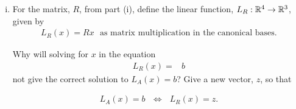 \begin{question}
\begin{enumerate}[(i)]
        \item For the matrix, $R$, from part (i), define the linear function, $L_R:{\mathbb R}^4\to{\mathbb R}^3$, given by
              \begin{align*}
                  L_R(x) = Rx\ \ \ \text{as matrix multiplication in the canonical bases}.
              \end{align*}

              Why will solving for $x$ in the equation
              \begin{align*}
                  L_R(x)=&b
              \end{align*}
              not give the correct solution to $L_A(x)=b$?  Give a new vector, $z$, so that

              \begin{align*}
                  L_A(x)=b\ \ \ \iff\ \ \ L_R(x)=z.
              \end{align*}
    \end{enumerate}
\end{question}

